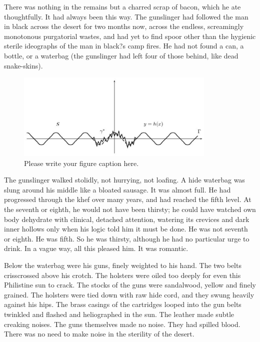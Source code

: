 \documentclass[
11pt,%
tightenlines,%
twoside,%
onecolumn,%
nofloats,%
nobibnotes,%
nofootinbib,%
superscriptaddress,%
noshowpacs,%
centertags]%
{revtex4}
\begin{document}
There was nothing in the remains but a charred scrap of bacon, which he ate thoughtfully. It had always been this way. The gunslinger had followed the man in black across the desert for two months now, across the endless, screamingly monotonous purgatorial wastes, and had yet to find spoor other than the hygienic sterile ideographs of the man in black?s camp fires. He had not found a can, a bottle, or a waterbag (the gunslinger had left four of those behind, like dead snake-skins).

\begin{figure}[h]
\setcaptionmargin{5mm}
\onelinecaptionstrue  %
\includegraphics[width=0.85\textwidth]{deform.eps}
\caption{Please write your figure caption here.}\label{fig:1}
\end{figure}

The gunslinger walked stolidly, not hurrying, not loafing. A hide waterbag was slung around his middle like a bloated sausage. It was almost full. He had progressed through the khef over many years, and had reached the fifth level. At the seventh or eighth, he would not have been thirsty; he could have watched own body dehydrate with clinical, detached attention, watering its crevices and dark inner hollows only when his logic told him it must be done. He was not seventh or eighth. He was fifth. So he was thirsty, although he had no particular urge to drink. In a vague way, all this pleased him. It was romantic.

Below the waterbag were his guns, finely weighted to his hand. The two belts crisscrossed above his crotch. The holsters were oiled too deeply for even this Philistine sun to crack. The stocks of the guns were sandalwood, yellow and finely grained. The holsters were tied down with raw hide cord, and they swung heavily against his hips. The brass casings of the cartridges looped into the gun belts twinkled and flashed and heliographed in the sun. The leather made subtle creaking noises. The guns themselves made no noise. They had spilled blood. There was no need to make noise in the sterility of the desert.
\end{document}
